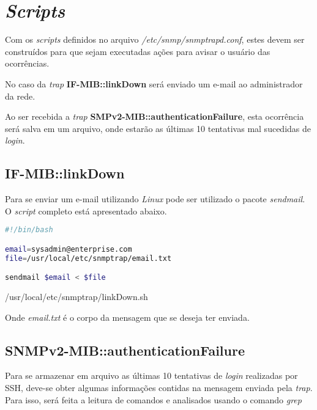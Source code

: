 \documentclass{article}
\begin{document}

\section{\textit{Scripts}}

Com os \textit{scripts} definidos no arquivo \textit{/etc/snmp/snmptrapd.conf}, estes devem ser construídos para que sejam executadas ações para avisar o usuário das ocorrências.

\par No caso da \textit{trap} \textbf{IF-MIB::linkDown} será enviado um e-mail ao administrador da rede.
\par Ao ser recebida a \textit{trap} \textbf{SMPv2-MIB::authenticationFailure}, esta ocorrência será salva em um arquivo, onde estarão as últimas 10 tentativas mal sucedidas de \textit{login}.

\subsection{IF-MIB::linkDown}

\par Para se enviar um e-mail utilizando \textit{Linux} pode ser utilizado o pacote \textit{sendmail}. O \textit{script} completo está apresentado abaixo.

\begin{program}
\begin{lstlisting}[language=bash]
#!/bin/bash

email=sysadmin@enterprise.com
file=/usr/local/etc/snmptrap/email.txt

sendmail $email < $file
\end{lstlisting}
\caption{/usr/local/etc/snmptrap/linkDown.sh}
\end{program}

\par Onde \textit{email.txt} é o corpo da mensagem que se deseja ter enviada.

\subsection{SNMPv2-MIB::authenticationFailure}

Para se armazenar em arquivo as últimas 10 tentativas de \textit{login} realizadas por SSH, deve-se obter algumas informações contidas na mensagem enviada pela \textit{trap}. Para isso, será feita a leitura de comandos e analisados usando o comando \textit{grep}
\end{document}
